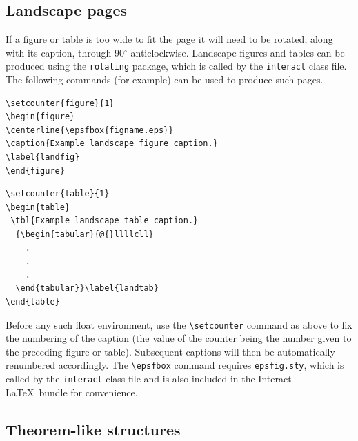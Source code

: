 \documentclass[]{interact}
\theoremstyle{plain}%
\theoremstyle{definition}
\theoremstyle{remark}
\begin{document}
\subsection{Landscape pages}

If a figure or table is too wide to fit the page it will need to be rotated, along with its caption, through 90$^{\circ}$ anticlockwise.
Landscape figures and tables can be produced using the \verb"rotating" package, which is called by the \texttt{interact} class file.
The following commands (for example) can be used to produce such pages.
\begin{verbatim}
\setcounter{figure}{1}
\begin{figure}
\centerline{\epsfbox{figname.eps}}
\caption{Example landscape figure caption.}
\label{landfig}
\end{figure}
\end{verbatim}
\begin{verbatim}
\setcounter{table}{1}
\begin{table}
 \tbl{Example landscape table caption.}
  {\begin{tabular}{@{}llllcll}
    .
    .
    .
  \end{tabular}}\label{landtab}
\end{table}
\end{verbatim}
Before any such float environment, use the \verb"\setcounter" command as above to fix the numbering of the caption (the value of the counter being the number given to the preceding figure or table). Subsequent captions will then be automatically renumbered accordingly. The \verb"\epsfbox" command requires \verb"epsfig.sty", which is called by the \texttt{interact} class file and is also included in the \textsf{Interact} \LaTeX\ bundle for convenience.


\subsection{Theorem-like structures}
\end{document}
